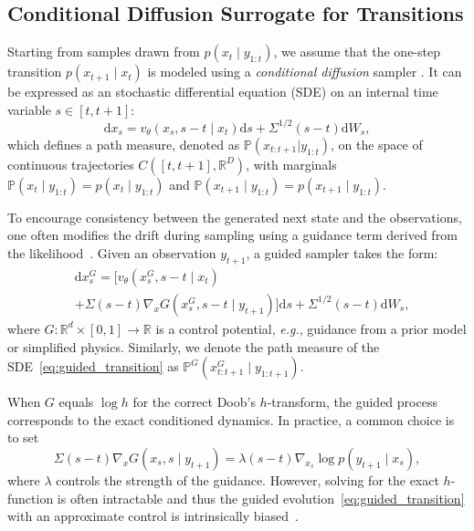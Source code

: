 \documentclass{article}
\newcommand{\dif}{{\mathrm{d}}}
\renewcommand{\P}{{\mathbb{P}}}
\newcommand{\R}{{\mathbb{R}}}
\theoremstyle{plain}
\theoremstyle{definition}
\theoremstyle{remark}
\begin{document}
\subsection{Conditional Diffusion Surrogate for Transitions}
\label{sec:condition_diffusion}


Starting from samples drawn from $p(x_t \mid y_{1:t})$, we assume that the one-step transition $p(x_{t+1} \mid x_t)$ is modeled using a \emph{conditional diffusion} sampler  \cite{lipman2022flow,tong2023improving}.
It can be expressed as an stochastic differential equation (SDE) on an internal time variable $s \in [t, t+1]$:
\begin{equation}
\dif x_s = v_\theta(x_s,s-t \mid x_t) \dif s + \Sigma^{1/2}(s-t) \dif W_s, 
\label{eq:diffusion_transition}
\end{equation}
which defines a path measure, denoted as $\P(x_{t:t+1}|y_{1:t})$, on the space of continuous trajectories $C([t,t+1], \R^D)$, with marginals 
$\P(x_t \mid y_{1:t}) = p(x_t \mid y_{1:t})$ and $\P(x_{t+1} \mid y_{1:t}) = p(x_{t+1} \mid y_{1:t})$.

To encourage consistency between the generated next state and the observations, one often modifies the drift during sampling using a guidance term derived from the likelihood~\cite{nichol2021glide,ho2022classifierfree}. Given an observation \( y_{t+1} \), a guided sampler takes the form:
\begin{equation}
\begin{aligned}
    &\dif x_s^G = \bigl[v_\theta(x_s^G, s-t \mid x_t) \\
    &+ \Sigma(s-t) \nabla_x G(x_s^G, s-t \mid y_{t+1})\bigr] \dif s + \Sigma^{1/2}(s-t) \dif W_s,
\end{aligned}
\label{eq:guided_transition}
\end{equation}
where $G: \mathbb{R}^d \times [0,1] \rightarrow \mathbb{R}$ is a control potential, \emph{e.g.}, guidance from a prior model or simplified physics. Similarly, we denote the path measure of the SDE~\eqref{eq:guided_transition} as $\P^G(x_{t:t+1}^G \mid y_{1:t+1})$.

When $G$ equals $\log h$ for the correct Doob's $h$-transform, the guided process corresponds to the exact conditioned dynamics. In practice, a common choice is to set 
$$
    \Sigma(s-t) \nabla_x G(x_s, s \mid y_{t+1}) = \lambda(s-t)\nabla_{x_s} \log p(y_{t+1} \mid x_s),
$$
where \( \lambda \) controls the strength of the guidance. 
However, solving for the exact $h$-function is often intractable and thus the guided evolution~\eqref{eq:guided_transition} with an approximate control is intrinsically biased~\cite{chidambaram2024does}.
\end{document}
